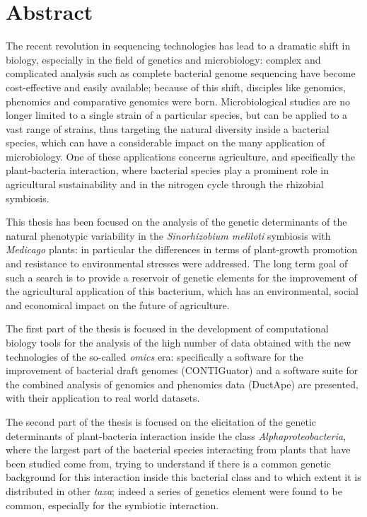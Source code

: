 \chapter{Abstract}

\small
The recent revolution in sequencing technologies has lead to a dramatic shift in biology, especially in the field of genetics and microbiology: complex and complicated analysis such as complete bacterial genome sequencing have become cost-effective and easily available; because of this shift, disciples like genomics, phenomics and comparative genomics were born. Microbiological studies are no longer limited to a single strain of a particular species, but can be applied to a vast range of strains, thus targeting the natural diversity inside a bacterial species, which can have a considerable impact on the many application of microbiology. One of these applications concerns agriculture, and specifically the plant-bacteria interaction, where bacterial species play a prominent role in agricultural sustainability and in the nitrogen cycle through the rhizobial symbiosis.

This thesis has been focused on the analysis of the genetic determinants of the natural phenotypic variability in the \textit{Sinorhizobium meliloti} symbiosis with \textit{Medicago} plants: in particular the differences in terms of plant-growth promotion and resistance to environmental stresses were addressed. The long term goal of such a search is to provide a reservoir of genetic elements for the improvement of the agricultural application of this bacterium, which has an environmental, social and economical impact on the future of agriculture.

The first part of the thesis is focused in the development of computational biology tools for the analysis of the high number of data obtained with the new technologies of the so-called \textit{omics} era: specifically a software for the improvement of bacterial draft genomes (CONTIGuator) and a software suite for the combined analysis of genomics and phenomics data (DuctApe) are presented, with their application to real world datasets.

The second part of the thesis is focused on the elicitation of the genetic determinants of plant-bacteria interaction inside the class \textit{Alphaproteobacteria}, where the largest part of the bacterial species interacting from plants that have been studied come from, trying to understand if there is a common genetic background for this interaction inside this bacterial class and to which extent it is distributed in other \textit{taxa}; indeed a series of genetics element were found to be common, especially for the symbiotic interaction.

